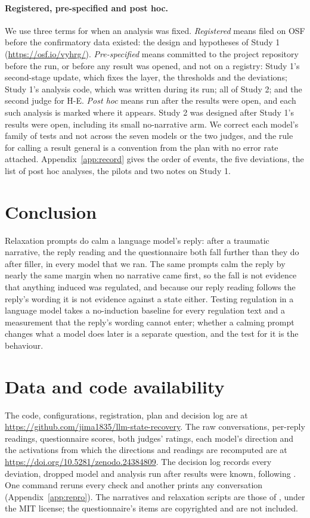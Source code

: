 \documentclass[11pt]{article}
\newcommand{\para}[1]{\paragraph{#1}}
\begin{document}
\para{Registered, pre-specified and post hoc.}
We use three terms for when an analysis was fixed.
\emph{Registered} means filed on OSF before the confirmatory data existed: the design and hypotheses
of Study 1 (\url{https://osf.io/vyhrg/}).
\emph{Pre-specified} means committed to the project repository before the run, or before any result
was opened, and not on a registry: Study 1's second-stage update, which fixes the layer, the
thresholds and the deviations; Study 1's analysis code, which was written during its run; all of
Study 2; and the second judge for H-E.
\emph{Post hoc} means run after the results were open, and each such analysis is marked where it
appears.
Study 2 was designed after Study 1's results were open, including its small no-narrative arm.
We correct each model's family of tests and not across the seven models or the two judges, and the
rule for calling a result general is a convention from the plan with no error rate attached.
Appendix~\ref{app:record} gives the order of events, the five deviations, the list of post hoc
analyses, the pilots and two notes on Study 1.

\section{Conclusion}
\label{sec:conclusion}
Relaxation prompts do calm a language model's reply: after a traumatic narrative, the reply reading
and the questionnaire both fall further than they do after filler, in every model that we ran.
The same prompts calm the reply by nearly the same margin when no narrative came first, so the fall
is not evidence that anything induced was regulated, and because our reply reading follows the
reply's wording it is not evidence against a state either.
Testing regulation in a language model takes a no-induction baseline for every regulation text and
a measurement that the reply's wording cannot enter; whether a calming prompt changes what a model
does later is a separate question, and the test for it is the behaviour.

\section*{Data and code availability}
The code, configurations, registration, plan and decision log are at
\url{https://github.com/jima1835/llm-state-recovery}.
The raw conversations, per-reply readings, questionnaire scores, both judges' ratings, each model's
direction and the activations from which the directions and readings are recomputed are at
\url{https://doi.org/10.5281/zenodo.24384809}.
The decision log records every deviation, dropped model and analysis run after results were known,
following \citet{ma2026}.
One command reruns every check and another prints any conversation (Appendix~\ref{app:repro}).
The narratives and relaxation scripts are those of \citet{benzion2025}, under the MIT license; the
questionnaire's items are copyrighted and are not included.
\end{document}
